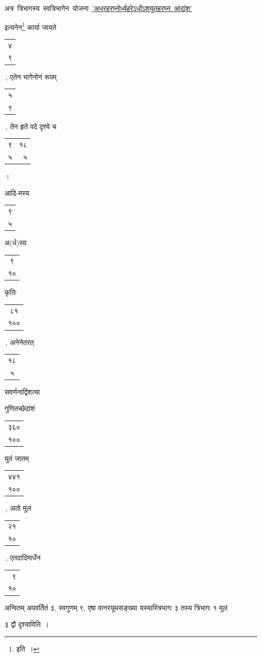 \documentclass[10pt, openany]{book}
\begin{document}
{अत्र \,त्रिभागस्य \,स्वत्रिभागेन \,योजना \,\hyperref[39]{'अधरहरघ्नोर्ध्वहरेऽधोंऽशयुतहरघ्न \,आद्यंश'} \,{इत्यनेन\renewcommand{\thefootnote}{\s ९}\footnote{\s इति~।} कार्या जायते \begin{tabular}{|c|}४\\ ९\\\hline \end{tabular}\,, एतेन भागेनोनं रूपम् \begin{tabular}{|c|}५\\ ९\\\hline \end{tabular}\,, तेन हृते पदे
दृश्ये च \begin{tabular}{|r|r|}९ &  १८ \\ ५ & ५\\\hline \end{tabular}\,।}
{आदि-मस्य \begin{tabular}{|c|}९\\ ५\\\hline \end{tabular} अ(र्ध)स्य \begin{tabular}{|c|}९\\ १०\\\hline \end{tabular} कृतिः \begin{tabular}{|c|}८१\\ १००\\\hline \end{tabular}\,, अनेनेतरत् \begin{tabular}{|c|}१८\\ ५\\\hline \end{tabular}
सवर्णनाद्विंशत्या}
{गुणितच्छेदांशं \begin{tabular}{|c|}३६०\\ १००\\\hline \end{tabular} युतं जातम् \begin{tabular}{|c|}४४१\\ १००\\\hline \end{tabular}\,, अतो मूलं \begin{tabular}{|c|}२१\\ १०\\\hline \end{tabular}\,,
एतदादिमार्धेन\begin{tabular}{r}९\\ १० \end{tabular}अन्वितम् अपवर्तितं ३, स्वगुणम् ९, एषा वानरयूथसङ्ख्या यस्यास्त्रिभागः ३ तस्य
त्रिभागः १ मूलं}
{३ द्वौ दृश्याविति~।}


}
\end{document}
